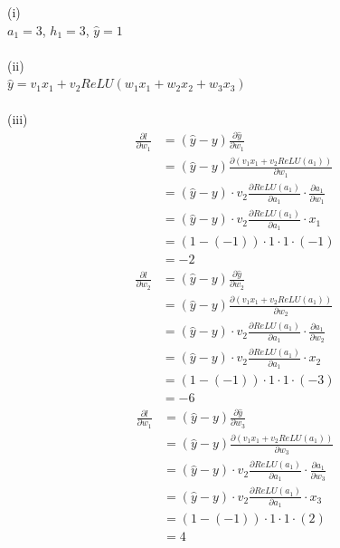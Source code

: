 \documentclass[11pt]{article}
\begin{document}
\begin{enumerate}
\begin{answertext}{22cm}{}

(i) \\
$a_{1} = 3$, $h_{1} = 3$, $\hat{y} = 1$ \\
\\
(ii) \\
$\hat{y} = v_{1}x_{1} + v_{2}ReLU(w_{1}x_{1} + w_{2}x_{2} + w_{3}x_{3})$ \\
\\
(iii) \\
\begin{align*}
\frac{\partial{l}}{\partial{w_{1}}} &= (\hat{y} - y) \frac{\partial{\hat{y}}}{\partial{w_{1}}} \\
&= (\hat{y} - y) \frac{\partial{(v_{1}x_{1} + v_{2}ReLU(a_{1}))}}{\partial{w_{1}}} \\
&= (\hat{y} - y) \cdot v_{2} \frac{\partial{ReLU(a_{1})}}{\partial{a_{1}}} \cdot \frac{\partial{a_{1}}}{\partial{w_{1}}} \\
&= (\hat{y} - y) \cdot v_{2} \frac{\partial{ReLU(a_{1})}}{\partial{a_{1}}} \cdot x_{1} \\
&= (1 - (-1)) \cdot 1 \cdot 1 \cdot (-1) \\
&= -2
\end{align*}
\begin{align*}
\frac{\partial{l}}{\partial{w_{2}}} &= (\hat{y} - y) \frac{\partial{\hat{y}}}{\partial{w_{2}}} \\
&= (\hat{y} - y) \frac{\partial{(v_{1}x_{1} + v_{2}ReLU(a_{1}))}}{\partial{w_{2}}} \\
&= (\hat{y} - y) \cdot v_{2} \frac{\partial{ReLU(a_{1})}}{\partial{a_{1}}} \cdot \frac{\partial{a_{1}}}{\partial{w_{2}}} \\
&= (\hat{y} - y) \cdot v_{2} \frac{\partial{ReLU(a_{1})}}{\partial{a_{1}}} \cdot x_{2} \\
&= (1 - (-1)) \cdot 1 \cdot 1 \cdot (-3) \\
&= -6
\end{align*}
\begin{align*}
\frac{\partial{l}}{\partial{w_{1}}} &= (\hat{y} - y) \frac{\partial{\hat{y}}}{\partial{w_{3}}} \\
&= (\hat{y} - y) \frac{\partial{(v_{1}x_{1} + v_{2}ReLU(a_{1}))}}{\partial{w_{3}}} \\
&= (\hat{y} - y) \cdot v_{2} \frac{\partial{ReLU(a_{1})}}{\partial{a_{1}}} \cdot \frac{\partial{a_{1}}}{\partial{w_{3}}} \\
&= (\hat{y} - y) \cdot v_{2} \frac{\partial{ReLU(a_{1})}}{\partial{a_{1}}} \cdot x_{3} \\
&= (1 - (-1)) \cdot 1 \cdot 1 \cdot (2) \\
&= 4
\end{align*}
  

\end{answertext}
\end{enumerate}
\end{document}
